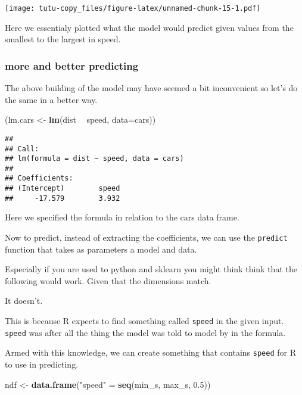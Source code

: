 \documentclass[]{article}
\newenvironment{Shaded}{\begin{snugshade}}{\end{snugshade}}
\newcommand{\KeywordTok}[1]{\textcolor[rgb]{0.13,0.29,0.53}{\textbf{#1}}}
\newcommand{\DataTypeTok}[1]{\textcolor[rgb]{0.13,0.29,0.53}{#1}}
\newcommand{\FloatTok}[1]{\textcolor[rgb]{0.00,0.00,0.81}{#1}}
\newcommand{\StringTok}[1]{\textcolor[rgb]{0.31,0.60,0.02}{#1}}
\newcommand{\OperatorTok}[1]{\textcolor[rgb]{0.81,0.36,0.00}{\textbf{#1}}}
\newcommand{\NormalTok}[1]{#1}
\begin{document}
\texttt{[image: tutu-copy\_files/figure-latex/unnamed-chunk-15-1.pdf]}

Here we essentialy plotted what the model would predict given values
from the smallest to the largest in speed.

\subsubsection{more and better
predicting}\label{more-and-better-predicting}

The above building of the model may have seemed a bit inconvenient so
let's do the same in a better way.

\begin{Shaded}
\begin{Highlighting}[]
\NormalTok{(lm.cars <-}\StringTok{ }\KeywordTok{lm}\NormalTok{(dist }\OperatorTok{~}\StringTok{ }\NormalTok{speed, }\DataTypeTok{data=}\NormalTok{cars))}
\end{Highlighting}
\end{Shaded}

\begin{verbatim}
## 
## Call:
## lm(formula = dist ~ speed, data = cars)
## 
## Coefficients:
## (Intercept)        speed  
##     -17.579        3.932
\end{verbatim}

Here we specified the formula in relation to the cars data frame.

Now to predict, instead of extracting the coefficients, we can use the
\texttt{predict} function that takes as parameters a model and data.

Especially if you are used to python and sklearn you might think think
that the following would work. Given that the dimensions match.

It doesn't.

This is because R expects to find something called \texttt{speed} in the
given input. \texttt{speed} was after all the thing the model was told
to model by in the formula.

Armed with this knowledge, we can create something that contains
\texttt{speed} for R to use in predicting.

\begin{Shaded}
\begin{Highlighting}[]
\NormalTok{ndf <-}\StringTok{ }\KeywordTok{data.frame}\NormalTok{(}\StringTok{"speed"}\NormalTok{ =}\StringTok{ }\KeywordTok{seq}\NormalTok{(min_s, max_s, }\FloatTok{0.5}\NormalTok{))}
\end{Highlighting}
\end{Shaded}
\end{document}
